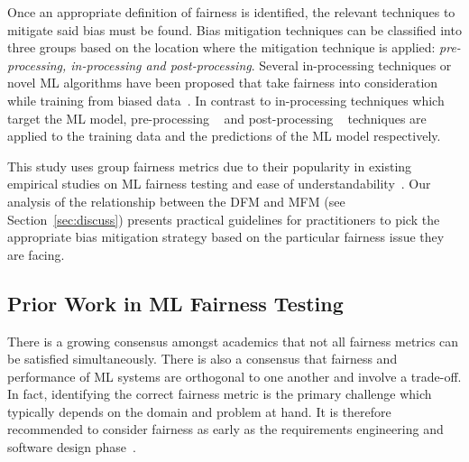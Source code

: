 \documentclass{article}
\begin{document}
Once an appropriate definition of fairness is identified, the relevant
techniques to mitigate said bias must be found. Bias mitigation
techniques can be classified into three groups based on the location
where the mitigation technique is applied: \emph{pre-processing,
in-processing and post-processing}. Several in-processing techniques
or novel ML algorithms have been proposed that take fairness into
consideration while training from biased
data \cite{zhang2018mitigating,agarwal2018reductions,kearns2018preventing,kamishima2012fairness}. In
contrast to in-processing techniques which target the ML model,
pre-processing
 \cite{feldman2015certifying,zemel2013learning,calmon2017optimized,kamiran2012data}
and post-processing
 \cite{pleiss2017fairness,hardt2016equality,kamiran2012decision}
techniques are applied to the training data and the predictions of the
ML model respectively.

This study uses group fairness metrics due to their popularity in
existing empirical studies on ML fairness testing and ease of
understandability \cite{zhang2021ignorance,biswas2020machine,biswas2021fair,hort2021fairea,chakraborty2021bias}. Our
analysis of the relationship between the DFM and MFM (see
Section \ref{sec:discuss}) presents practical guidelines for
practitioners to pick the appropriate bias mitigation strategy based
on the particular fairness issue they are facing.

\subsection{Prior Work in ML Fairness Testing}\label{sec:prior-work}

There is a growing consensus amongst academics that not all fairness
metrics can be satisfied simultaneously. There is also a consensus
that fairness and performance of ML systems are orthogonal to one
another and involve a trade-off. In fact, identifying the correct
fairness metric is the primary challenge which typically depends on
the domain and problem at hand. It is therefore recommended to
consider fairness as early as the requirements engineering and
software design
phase \cite{zhang2020machine,chen2022fairness,mehrabi2021survey,zhang2021ignorance}.
\end{document}
